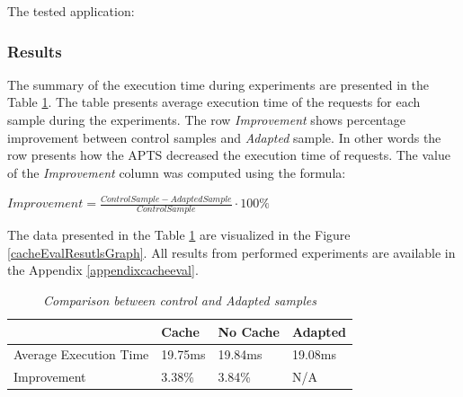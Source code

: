\documentclass[10pt,a4paper]{article}
\begin{document}
\vspace{1mm}\noindent{}\vspace{1mm}

The tested application:

\vspace{1mm}\noindent{}\vspace{1mm}
 

\subsubsection{Results} 

The summary of the execution time during experiments are presented in the Table \ref{cacheCompResutls}. The table presents average execution time of the requests for each sample during the experiments. The row \textit{Improvement} shows percentage improvement between control samples and \textit{Adapted} sample. In other words the row presents how the APTS decreased the execution time of requests. The value of the \textit{Improvement} column was computed using the formula: 

\begin{center}
$Improvement = \frac{ControlSample - AdaptedSample}{ControlSample} \cdot 100\%$
\end{center}

The data presented in the Table \ref{cacheCompResutls} are visualized in the Figure \ref{cacheEvalResutlsGraph}.  All results from performed experiments are available in the Appendix \ref{appendixcacheeval}. 

\begin{table}[!htb]
\caption{\textit{Comparison between control and Adapted samples}} \label{cacheCompResutls}
\begin{tabularx}{\textwidth}{p{4cm}|X|X|X}
 & \textbf{Cache} & \textbf{No Cache} & \textbf{Adapted} \\ \hline
Average Execution Time &  19.75ms & 19.84ms & 19.08ms\\ \hline
Improvement &  3.38\% & 3.84\% & N/A\\ 
\end{tabularx}
\end{table}
\end{document}
